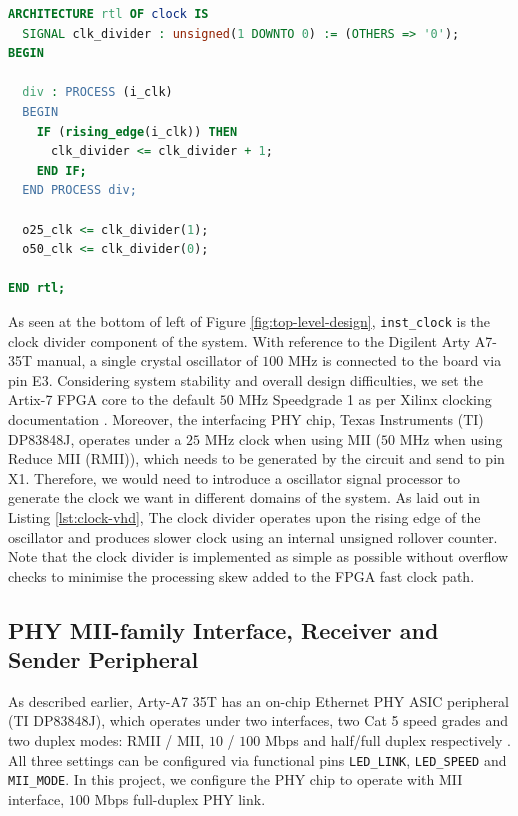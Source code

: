 \documentclass[a4paper]{report}
\newcommand{\code}{\texttt}
\begin{document}
\begin{lstlisting}[language=VHDL, caption=Snippet of Clock Divider \code{clock.vhd}, label={lst:clock-vhd}]
ARCHITECTURE rtl OF clock IS
  SIGNAL clk_divider : unsigned(1 DOWNTO 0) := (OTHERS => '0');
BEGIN

  div : PROCESS (i_clk)
  BEGIN
    IF (rising_edge(i_clk)) THEN
      clk_divider <= clk_divider + 1;
    END IF;
  END PROCESS div;

  o25_clk <= clk_divider(1);
  o50_clk <= clk_divider(0);
 
END rtl;
\end{lstlisting}

As seen at the bottom of left of Figure \ref{fig:top-level-design}, \code{inst\_clock} is the clock divider component of the system. With reference to the Digilent Arty A7-35T manual\cite{digilent-arty}, a single crystal oscillator of $100$ MHz is connected to the board via pin E3. Considering system stability and overall design difficulties, we set the Artix-7 FPGA core to the default $50$ MHz Speedgrade 1 as per Xilinx clocking documentation \cite{xilinx-7-clocking}. Moreover, the interfacing PHY chip, Texas Instruments (TI) DP83848J, operates under a $25$ MHz clock when using MII ($50$ MHz when using Reduce MII (RMII)), which needs to be generated by the circuit and send to pin X1\cite{texas-instruments-dp83848x}. Therefore, we would need to introduce a oscillator signal processor to generate the clock we want in different domains of the system. As laid out in Listing \ref{lst:clock-vhd}, The clock divider operates upon the rising edge of the oscillator and produces slower clock using an internal unsigned rollover counter. Note that the clock divider is implemented as simple as possible without overflow checks to minimise the processing skew added to the FPGA fast clock path.

\subsection{PHY MII-family Interface, Receiver and Sender Peripheral}

As described earlier, Arty-A7 35T has an on-chip Ethernet PHY ASIC peripheral (TI DP83848J), which operates under two interfaces, two Cat 5 speed grades and two duplex modes: RMII / MII, $10$ / $100$ Mbps and half/full duplex respectively \cite{texas-instruments-dp83848x}. All three settings can be configured via functional pins \code{LED\_LINK}, \code{LED\_SPEED} and \code{MII\_MODE}. In this project, we configure the PHY chip to operate with MII interface, $100$ Mbps full-duplex PHY link.
\end{document}
